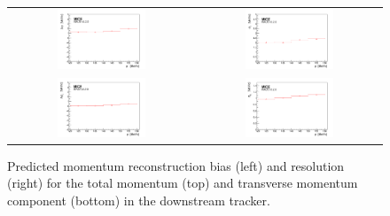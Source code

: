 \begin{figure}[ht]
	\centering
    \begin{tabular}{cc}
	    \includegraphics[width=0.5\textwidth]{downstream_p_bias_p_logo.pdf} &	
        \includegraphics[width=0.5\textwidth]{downstream_p_resolution_p_logo.pdf} \\
        \includegraphics[width=0.5\textwidth]{downstream_pt_bias_p_logo.pdf} &
        \includegraphics[width=0.5\textwidth]{downstream_pt_resolution_p_logo.pdf}
    \end{tabular}
	\caption{\label{trackers:performance:resolutions:down} Predicted momentum reconstruction bias (left) and resolution (right) for the total momentum (top) and transverse momentum component (bottom) in the downstream tracker.}
\end{figure}


